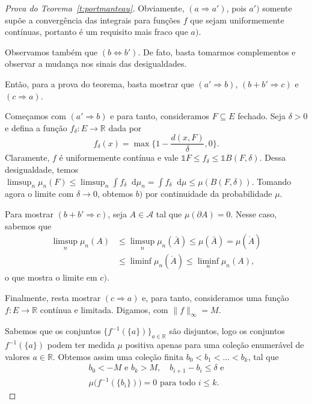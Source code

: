 \documentclass[reqno, final]{book}
\newcommand*\1{\mathds{1}}
\renewcommand*\d{\mathop{}\!\mathrm{d}}
\begin{document}
\begin{proof}[Prova do Teorema~\ref{t:portmanteau}]
  Obviamente, $(a \Rightarrow a')$, pois $a')$ somente supõe a convergência das integrais para funções $f$ que sejam uniformemente contínuas, portanto é um requisito mais fraco que $a)$.

  Observamos também que $(b \Leftrightarrow b')$.
  De fato, basta tomarmos complementos e observar a mudança nos sinais das desigualdades.

  Então, para a prova do teorema, basta mostrar que $(a' \Rightarrow b)$, $(b + b' \Rightarrow c)$ e $(c \Rightarrow a)$.

  Começamos com $(a' \Rightarrow b)$ e para tanto, consideramos $F \subseteq E$ fechado.
  Seja $\delta > 0$ e defina a função $f_\delta: E \to \mathbb{R}$ dada por
  \begin{equation}
    f_\delta (x) = \max \Big\{ 1 - \frac{d(x, F)}{\delta}, 0 \Big\}.
  \end{equation}
  Claramente, $f$ é uniformemente contínua e vale $\1{F} \leq f_\delta \leq \1{B(F,\delta)}$.
  Dessa desigualdade, temos $\limsup_n \mu_n(F) \leq \limsup_n \int f_\delta \d \mu_n = \int f_\delta \d \mu \leq \mu(B(F,\delta))$.
  Tomando agora o limite com $\delta \to 0$, obtemos $b)$ por continuidade da probabilidade $\mu$.


  Para mostrar $(b + b' \Rightarrow c)$, seja $A \in \mathcal{A}$ tal que $\mu(\partial A) = 0$.
  Nesse caso, sabemos que
  \begin{equation*}
    \begin{split}
      \limsup_n \mu_n(A) & \leq \limsup_n \mu_n(\bar A) \leq \mu (\bar A) = \mu (\mathring{A})\\
      & \leq \liminf \mu_n (\mathring{A}) \leq \liminf_n \mu_n (A),
    \end{split}
  \end{equation*}
  o que mostra o limite em $c)$.

  Finalmente, resta mostrar $(c \Rightarrow a)$ e, para tanto, consideramos uma função $f: E \to \mathbb{R}$ contínua e limitada.
  Digamos, com $\lVert f \rVert_\infty = M$.

  Sabemos que os conjuntos $\{f^{-1}(\{a\})\}_{a \in \mathbb{R}}$ são disjuntos, logo os conjuntos $f^{-1}(\{a\})$ podem ter medida $\mu$ positiva apenas para uma coleção enumerável de valores $a \in \mathbb{R}$.
  Obtemos assim uma coleção finita $b_0 < b_1 < \dots < b_k$, tal que
  \begin{equation}
    \begin{array}{c}
      b_0 < -M \text{ e } b_k > M, \quad b_{i+1} - b_i \leq \delta \text{ e}\\
      \mu\big(f^{-1} (\{b_i\}) \big) = 0 \text{ para todo $i \leq k$}.
    \end{array}
  \end{equation}


\end{proof}
\end{document}
